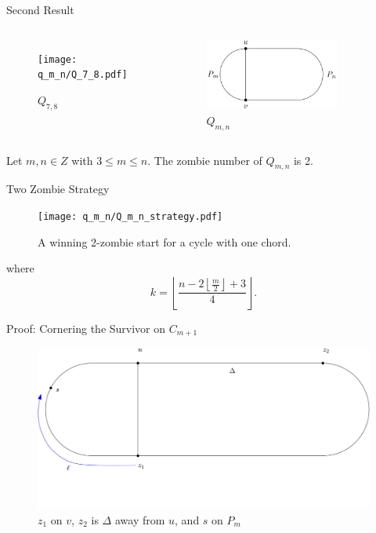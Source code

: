 \begin{frame}{Second Result}
\begin{columns}[onlytextwidth,T]
\begin{figure}
\texttt{[image: q\_m\_n/Q\_7\_8.pdf]}
\caption{$Q_{7,8}$}
\end{figure}
\begin{figure}
\includegraphics[width=0.8\textwidth]{q_m_n/Q_m_n_basic.png}
\caption{$Q_{m,n}$}
\end{figure}
\end{columns}
\begin{theorem}
 Let $m, n \in Z$ with $3 \leq m \leq n$. The zombie number of $Q_{m,n}$ is 2.
\end{theorem}
\end{frame}

\begin{frame}{Two Zombie Strategy}
\begin{figure}
\texttt{[image: q\_m\_n/Q\_m\_n\_strategy.pdf]}
\caption{A winning 2-zombie start for a cycle with one chord.}
\end{figure}
where
\[ k = \left\lfloor \frac{n - 2 \left\lfloor\frac{m}{2}\right\rfloor +3}{4} \right\rfloor. \]
\end{frame}

\begin{frame}{Proof: Cornering the Survivor on $C_{m+1}$}
\begin{figure}
\centering
\includegraphics{q_m_n/diagram1}
\caption{$z_1$ on $v$, $z_2$ is $\Delta$ away from $u$, and $s$ on $P_m$ \label{fig:onthechord}}
\end{figure}
\end{frame}

